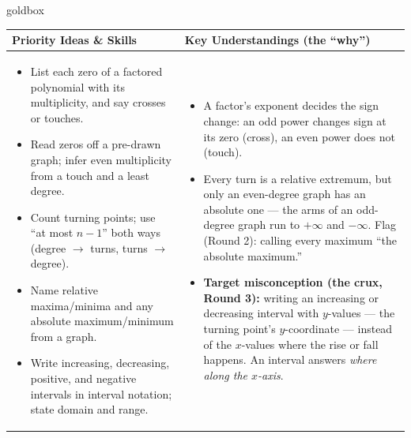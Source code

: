 \documentclass[10pt]{article}
\begin{document}
\renewcommand{\arraystretch}{1.4}
\begin{skillbox}{goldbox}
\begin{tabularx}{\linewidth}{@{}X|X@{}}
\textbf{Priority Ideas \& Skills} & \textbf{Key Understandings (the ``why'')} \\[2pt]
\hline
\vspace{-6pt}
\begin{itemize}[leftmargin=1.1em, nosep, after=\vspace{2pt}]
  \item List each zero of a factored polynomial with its multiplicity, and say crosses or touches.
  \item Read zeros off a pre-drawn graph; infer even multiplicity from a touch and a least degree.
  \item Count turning points; use ``at most $n-1$'' both ways (degree $\to$ turns, turns $\to$ degree).
  \item Name relative maxima/minima and any absolute maximum/minimum from a graph.
  \item Write increasing, decreasing, positive, and negative intervals in interval notation; state domain and range.
\end{itemize}
&
\vspace{-6pt}
\begin{itemize}[leftmargin=1.1em, nosep, after=\vspace{2pt}]
  \item A factor's exponent decides the sign change: an odd power changes sign at its zero
        (cross), an even power does not (touch).
  \item Every turn is a relative extremum, but only an even-degree graph has an absolute one ---
        the arms of an odd-degree graph run to $+\infty$ and $-\infty$. Flag (Round 2): calling every
        maximum ``the absolute maximum.''
  \item \textbf{Target misconception (the crux, Round 3):} writing an increasing or decreasing
        interval with $y$-values --- the turning point's $y$-coordinate --- instead of the
        $x$-values where the rise or fall happens. An interval answers \emph{where along the
        $x$-axis}.
\end{itemize}
\end{tabularx}
\end{skillbox}
\end{document}
